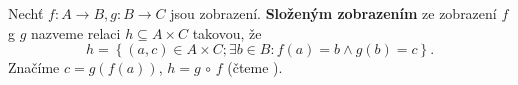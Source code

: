 \begin{definition}
  Nechť $f:A\to B, g:B\to C$ jsou zobrazení. \textbf{Složeným zobrazením} ze zobrazení $f$ g $g$ nazveme relaci $h\subseteq A\times C$ takovou, že
  \[
    h=\left\{ (a,c)\in A\times C;\exists b\in B: f(a)=b \land g(b)=c \right\}.
  \]
  Značíme $c=g(f(a))$, $h=g\, \circ \, f $ (čteme ).
\end{definition}
